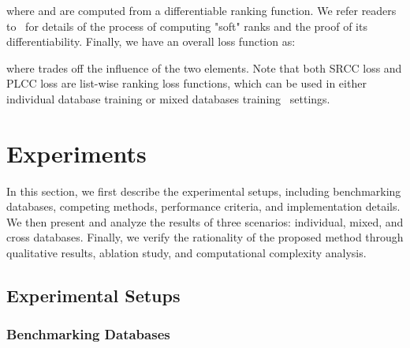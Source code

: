 \documentclass[journal]{IEEEtran}
\begin{document}
{{where  and  are computed from a differentiable ranking function. We refer readers to~\cite{blondel2020fast} for details of the process of computing "soft" ranks and the proof of its differentiability. Finally, we have an overall loss function as:

where  trades off the influence of the two elements. Note that both SRCC loss and PLCC loss are list-wise ranking loss functions, which can be used in either individual database training or mixed databases training~\cite{li2021unified} settings.



\section{Experiments}\label{Sec:Experiments}
In this section, we first describe the experimental setups, including benchmarking databases, competing methods, performance criteria, and implementation details. We then present and analyze the results of three scenarios: individual, mixed, and cross databases. Finally, we verify the rationality of the proposed method through qualitative results, ablation study, and computational complexity analysis.
\subsection{Experimental Setups}\label{subsec:expsetup}
\subsubsection{Benchmarking Databases}\label{subsec:VQAdatabase}

}}
\end{document}
